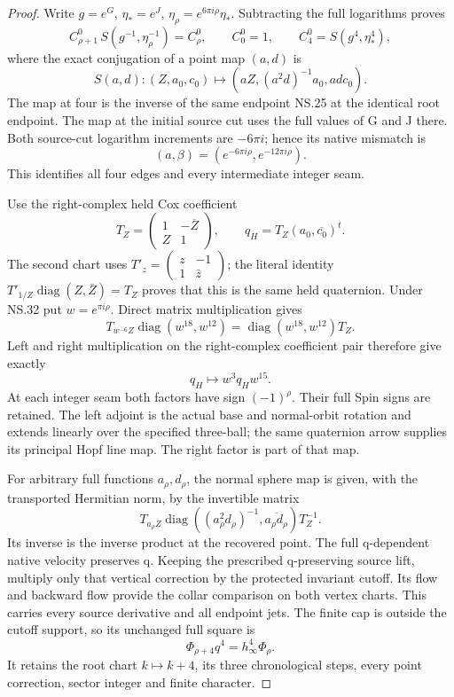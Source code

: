 \begin{proof}
Write \(g=e^G\), \(\eta_*=e^J\),
\(\eta_\rho=e^{6\pi i\rho}\eta_*\). Subtracting the full
logarithms proves
\[
 C^0_{\rho+1}\,S(g^{-1},\eta_\rho^{-1})=C^0_\rho,
 \qquad C^0_0=1,\qquad C^0_4=S(g^4,\eta_*^4),
 \tag{NS.30}
\]
where the exact conjugation of a point map \((a,d)\) is
\[
 S(a,d):(Z,a_0,c_0)\mapsto(aZ,(a^2d)^{-1}a_0,ad c_0).
 \tag{NS.31}
\]
The map at four is the inverse of the same endpoint NS.25 at the
identical root endpoint. The map at the initial source cut uses the
full values of G and J there. Both source-cut logarithm increments
are \(-6\pi i\); hence its native mismatch is
\[
 (a,\beta)=(e^{-6\pi i\rho},e^{-12\pi i\rho}).
 \tag{NS.32}
\]
This identifies all four edges and every intermediate integer seam.

Use the right-complex held Cox coefficient
\[
 T_Z=\begin{pmatrix}1&-\overline Z\\Z&1\end{pmatrix},\qquad
 q_H=T_Z(a_0,\overline{c_0})^t.
 \tag{NS.33}
\]
The second chart uses
\(T'_z=\left(\begin{smallmatrix}z&-1\\1&\bar z\end{smallmatrix}\right)\);
the literal identity
\(T'_{1/Z}\operatorname{diag}(Z,\bar Z)=T_Z\)
proves that this is the same held quaternion. Under NS.32 put
\(w=e^{\pi i\rho}\). Direct matrix multiplication gives
\[
 T_{w^{-6}Z}\operatorname{diag}(w^{18},w^{12})
       =\operatorname{diag}(w^{18},w^{12})T_Z.
\]
Left and right multiplication on the right-complex coefficient pair
therefore give exactly
\[
                  q_H\longmapsto w^3q_Hw^{15}.
 \tag{NS.34}
\]
At each integer seam both factors have sign \((-1)^\rho\).
Their full Spin signs are retained. The left adjoint is the actual
base and normal-orbit rotation and extends linearly over the specified
three-ball; the same quaternion arrow supplies its principal Hopf
line map. The right factor is part of that map.

For arbitrary full functions \(a_\rho,d_\rho\), the normal sphere
map is given, with the transported Hermitian norm, by the invertible
matrix
\[
 T_{a_\rho Z}
 \operatorname{diag}((a_\rho^2d_\rho)^{-1},
                    \overline{a_\rho d_\rho})T_Z^{-1}.
 \tag{NS.35}
\]
Its inverse is the inverse product at the recovered point. The full
q-dependent native velocity preserves q. Keeping the prescribed
q-preserving source lift, multiply only that vertical correction by
the protected invariant cutoff. Its flow and backward flow provide
the collar comparison on both vertex charts. This carries every
source derivative and all endpoint jets. The finite cap is outside
the cutoff support, so its unchanged full square is
\[
              \Phi_{\rho+4}q^4=h_\infty^4\Phi_\rho.
 \tag{NS.36}
\]
It retains the root chart \(k\mapsto k+4\), its three chronological
steps, every point correction, sector integer and finite character.


\end{proof}
